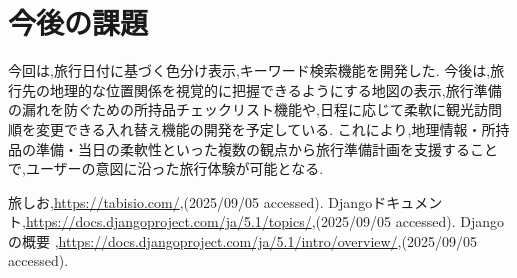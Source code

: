 \documentclass[a4j,twocolumn]{jsarticle}
\begin{document}
\section{今後の課題}
\label{sec:org9370d46}
今回は,旅行日付に基づく色分け表示,キーワード検索機能を開発した.
今後は,旅行先の地理的な位置関係を視覚的に把握できるようにする地図の表示,旅行準備の漏れを防ぐための所持品チェックリスト機能や,日程に応じて柔軟に観光訪問順を変更できる入れ替え機能の開発を予定している.
これにより,地理情報・所持品の準備・当日の柔軟性といった複数の観点から旅行準備計画を支援することで,ユーザーの意図に沿った旅行体験が可能となる.



\small\setlength\baselineskip{10pt}
\begin{thebibliography}{9}

 旅しお,\url{https://tabisio.com/},(2025/09/05 accessed).
Djangoドキュメント,\url{https://docs.djangoproject.com/ja/5.1/topics/},(2025/09/05 accessed).
Djangoの概要 ,\url{https://docs.djangoproject.com/ja/5.1/intro/overview/},(2025/09/05 accessed).
\end{thebibliography}
\end{document}
